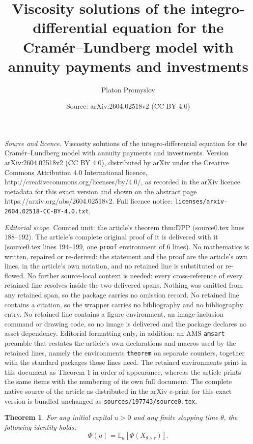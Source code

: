 \documentclass[10pt,a4paper]{amsart}
\title{Viscosity solutions of the integro-differential equation for the Cram\'{e}r--Lundberg model with annuity payments and investments}
\author{Platon Promyslov}
\date{Source: arXiv:2604.02518v2 (CC BY 4.0)}
\newtheorem{theorem}{Theorem}
\begin{document}
\maketitle

\noindent\emph{Source and licence.} Viscosity solutions of the integro-differential equation for the Cram\'{e}r--Lundberg model with annuity payments and investments. Version arXiv:2604.02518v2 (CC BY 4.0), distributed by arXiv under the Creative Commons Attribution 4.0 International licence, http://creativecommons.org/licenses/by/4.0/, as recorded in the arXiv licence metadata for this exact version and shown on the abstract page https://arxiv.org/abs/2604.02518v2. Full licence notice: \texttt{licenses/arxiv-2604.02518-CC-BY-4.0.txt}.\par\smallskip

\noindent\textit{Editorial scope.} Counted unit: the article's theorem thm:DPP (source0.tex lines 188--192). The article's complete original proof of it is delivered with it (source0.tex lines 194--199, one \texttt{proof} environment of 6 lines). No mathematics is written, repaired or re-derived: the statement and the proof are the article's own lines, in the article's own notation, and no retained line is substituted or re-flowed.  No further source-local context is needed: every cross-reference of every retained line resolves inside the two delivered spans.  Nothing was omitted from any retained span, so the package carries no omission record.  No retained line contains a citation, so the wrapper carries no bibliography and no bibliography entry.  No retained line contains a figure environment, an image-inclusion command or drawing code, so no image is delivered and the package declares no asset dependency.  Editorial formatting only, in addition: an AMS \texttt{amsart} preamble that restates the article's own declarations and macros used by the retained lines, namely the environments \texttt{theorem} on separate counters, together with the standard packages those lines need.  The retained environments print in this document as Theorem 1 in order of appearance, whereas the article prints the same items with the numbering of its own full document.  The complete native source of the article as distributed in the arXiv e-print for this exact version is bundled unchanged as \texttt{sources/197743/source0.tex}.
\begin{theorem}
\label{thm:DPP}
For any initial capital $u > 0$ and any finite stopping time $\theta$, the following identity holds:
$$ \Phi(u) = \mathbb{E}_u[\Phi(X_{\theta \wedge \tau})]. $$
\end{theorem}
\end{document}
